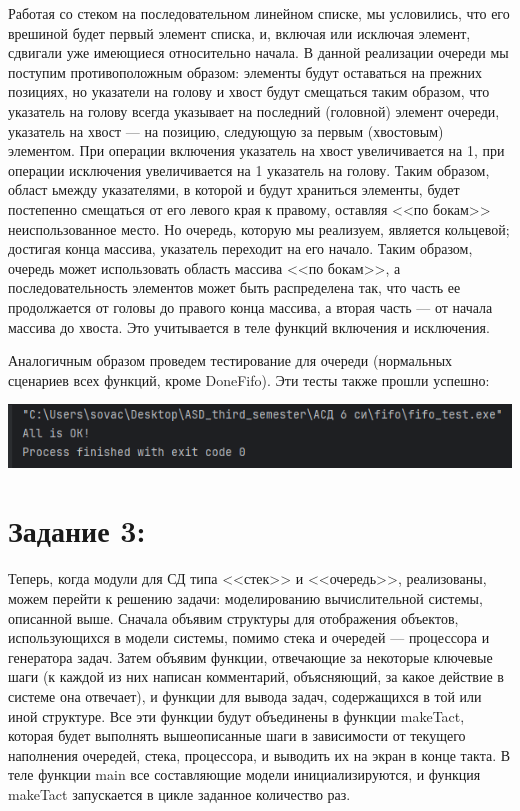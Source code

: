 \documentclass[12pt]{article}
\begin{document}
{	 
	
	Работая со стеком на последовательном линейном списке, мы условились, что его врешиной будет первый элемент списка, и, включая или исключая элемент, сдвигали уже имеющиеся относительно начала. В данной реализации очереди мы поступим противоположным образом: элементы будут оставаться на прежних позициях, но указатели на голову и хвост будут смещаться таким образом, что указатель на голову всегда указывает на последний (головной) элемент очереди, указатель на хвост --- на позицию, следующую за первым (хвостовым) элементом. При операции включения указатель на хвост увеличивается на 1, при операции исключения увеличивается на 1 указатель на голову. Таким образом, област ьмежду указателями, в которой и будут храниться элементы, будет постепенно смещаться от его левого края к правому, оставляя <<по бокам>> неиспользованное место. Но очередь, которую мы реализуем, является кольцевой; достигая конца массива, указатель переходит на его начало. Таким образом, очередь может использовать область массива <<по бокам>>, а последовательность элементов может быть распределена так, что часть ее продолжается от головы до правого конца массива, а вторая часть --- от начала массива до хвоста. Это учитывается в теле функций включения и исключения.
	
	
	
	Аналогичным образом проведем тестирование для очереди (нормальных сценариев всех функций, кроме DoneFifo). Эти тесты также прошли успешно: 
		
	 

	\includegraphics[width=150mm]{images/fifo_test.png}
	
	\section{Задание 3:}
	\label{task_3}
	
	Теперь, когда модули для СД типа <<стек>> и <<очередь>>, реализованы, можем перейти к решению задачи: моделированию вычислительной системы, описанной выше. Сначала объявим структуры для отображения объектов, использующихся в модели системы,  помимо стека и очередей --- процессора и генератора задач. Затем объявим функции, отвечающие за некоторые ключевые шаги (к каждой из них написан комментарий, объясняющий, за какое действие в системе она отвечает), и функции для вывода задач, содержащихся в той или иной структуре. Все эти функции будут объединены в функции makeTact, которая будет выполнять вышеописанные шаги в зависимости от текущего наполнения очередей, стека, процессора, и выводить их на экран в конце такта. В теле функции main все составляющие модели инициализируются, и функция makeTact запускается в цикле заданное количество раз.
	
}
\end{document}
